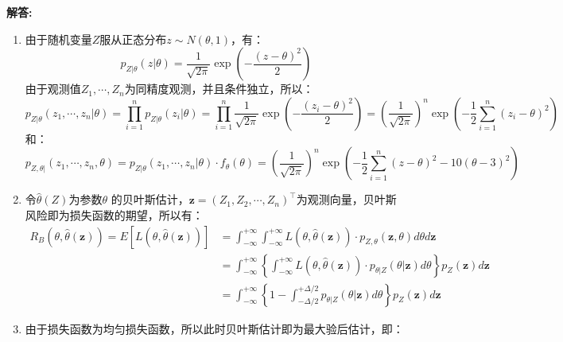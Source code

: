 \documentclass[12pt, onecolumn]{article}
\newcommand\normf{\fangsong}
\newenvironment{solution}{\par\noindent\normf\textbf{解答: }}{\leavevmode\\\par}
\begin{document}
	\begin{solution}
		\begin{enumerate}
			\item 由于随机变量$Z$服从正态分布$z\sim N(\theta,1)$，有：
			\begin{equation*}
			p_{Z\vert\theta}(z\vert \theta)=\frac{1}{\sqrt{2\pi}}\exp\left( -\frac{(z-\theta)^2}{2}\right) 
			\end{equation*}
			由于观测值$Z_1,\cdots,Z_n$为同精度观测，并且条件独立，所以：
			\begin{equation*}
			p_{Z\vert\theta}(z_1,\cdots,z_n\vert\theta)=\prod_{i=1}^{n}p_{Z\vert\theta}(z_i\vert \theta)=\prod_{i=1}^{n}\frac{1}{\sqrt{2\pi}}\exp\left( -\frac{(z_i-\theta)^2}{2}\right) =
			\left( \frac{1}{\sqrt{2\pi}}\right)^n\exp\left(
			-\frac{1}{2}\sum_{i=1}^{n}(z_i-\theta)^2
			 \right)  
			\end{equation*}
			和：
			\begin{equation*}
			p_{Z,\theta|}(z_1,\cdots,z_n,\theta)=p_{Z\vert\theta}(z_1,\cdots,z_n\vert\theta)\cdot f_{\theta}(\theta)=
			\left( \frac{1}{\sqrt{2\pi}}\right)^n\exp\left(
			-\frac{1}{2}\sum_{i=1}^{n}(z-\theta)^2-10(\theta-3)^2
			\right)  
			\end{equation*}
			\item 令$\hat{\theta}(Z)$为参数$\theta$ 的贝叶斯估计，$\boldsymbol{z}=\left( Z_1,Z_2,\cdots,Z_n\right)^\top $为观测向量，贝叶斯风险即为损失函数的期望，所以有：
			\begin{equation*}
			\begin{aligned}
			R_B(\theta,\hat{\theta}(\boldsymbol{z}))=E\left[L(\theta,\hat{\theta}(\boldsymbol{z}))
			\right] &=
			\int_{-\infty}^{+\infty}\int_{-\infty}^{+\infty}
			L(\theta,\hat{\theta}(\boldsymbol{z}))\cdot p_{Z,\theta}(\boldsymbol{z},\theta)
			d\theta d\boldsymbol{z}
			\\
			&=\int_{-\infty}^{+\infty}\left\lbrace \int_{-\infty}^{+\infty}
			L(\theta,\hat{\theta}(\boldsymbol{z}))\cdot p_{\theta\vert Z}(\theta\vert \boldsymbol{z})
			d\theta \right\rbrace p_{Z}(\boldsymbol{z})d\boldsymbol{z}
			\\&=\int_{-\infty}^{+\infty}\left\lbrace
			1- \int_{-\Delta/2}^{+\Delta/2}
			p_{\theta\vert Z}(\theta\vert \boldsymbol{z})
			d\theta 
			\right\rbrace p_{Z}(\boldsymbol{z})d\boldsymbol{z}
			\end{aligned}
			\end{equation*}
			\item 由于损失函数为均匀损失函数，所以此时贝叶斯估计即为最大验后估计，即：
			\begin{equation*}

\end{equation*}
\end{enumerate}
\end{solution}
\end{document}
